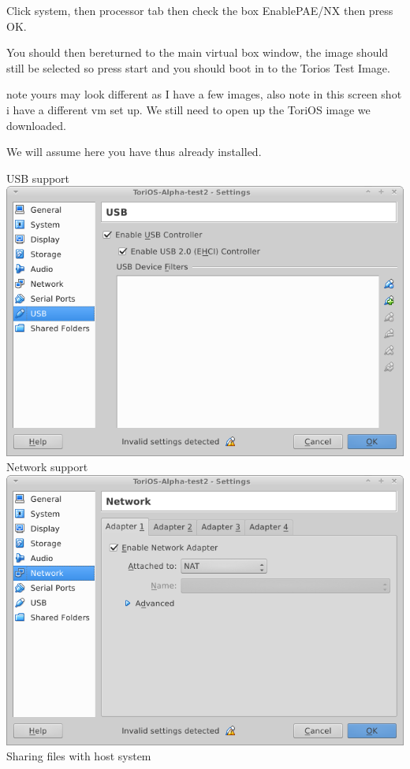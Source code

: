 \documentclass[12pt,a4paper]{book}
\begin{document}
Click system, then processor tab then check the box EnablePAE/NX then press OK.

You should then bereturned to the main virtual box window,  the image should still be selected so press start and you should boot in to the Torios Test Image. 

 note yours may look different as I have a few images,  also note in this screen shot i have a different vm set up.  We still need to open up the ToriOS image we downloaded. 

We will assume here you have thus already installed.

USB support \\
\includegraphics[width=0.7\linewidth]{screen-shots/virtualbox-usb}\\

Network support\\
\includegraphics[width=0.7\linewidth]{screen-shots/virtualbox-networking}\\

Sharing files with host system\\
\end{document}

